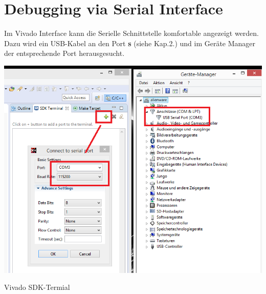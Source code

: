 \section{Debugging via Serial Interface}

Im Vivado Interface kann die Serielle Schnittstelle komfortable angezeigt werden. Dazu wird ein USB-Kabel  an den 
Port \textbf{s} (siehe Kap.2.) und im Geräte Manager der entsprechende Port herausgesucht.\\

\begin{minipage}{\textwidth}
    \begin{center}        
        \includegraphics[scale=0.5]{img/vivadosdk_serial.png} 
    \end{center}
\end{minipage}
\begin{center}
Vivado SDK-Termial
\end{center}





